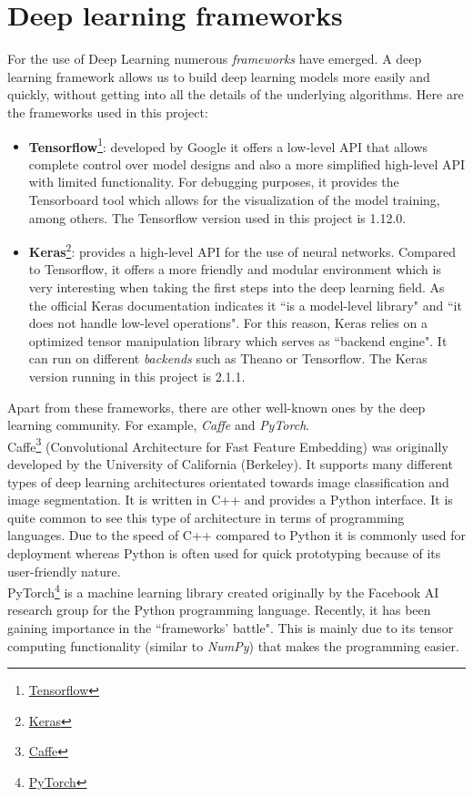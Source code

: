 \section{Deep learning frameworks}
For the use of Deep Learning numerous \textit{frameworks} have emerged. A deep learning framework allows us to build deep learning models more easily and quickly, without getting into all the details of the underlying algorithms. Here are the frameworks used in this project:
\begin{itemize}
\item \textbf{Tensorflow}\footnote {\href{https://www.tensorflow.org/}{Tensorflow}}: developed by Google it offers a low-level API that allows complete control over model designs and also a more simplified high-level API with limited functionality. For debugging purposes, it provides the Tensorboard tool which allows for the visualization of the model training, among others. The Tensorflow version used in this project is 1.12.0.
\item \textbf{Keras}\footnote {\href{https://keras.io/}{Keras}}: provides a high-level API for the use of neural networks. Compared to Tensorflow, it offers a more friendly and modular environment which is very interesting when taking the first steps into the deep learning field. As the official Keras documentation indicates it ``is a model-level library" and ``it does not handle low-level operations". For this reason, Keras relies on a optimized tensor manipulation library which serves as ``backend engine". It can run on different \textit{backends} such as Theano or Tensorflow. The Keras version running in this project is 2.1.1.
\end{itemize}
Apart from these frameworks, there are other well-known ones by the deep learning community. For example, \textit{Caffe} and \textit{PyTorch}.\\
Caffe\footnote {\href{https://caffe.berkeleyvision.org/}{Caffe}} (Convolutional Architecture for Fast Feature Embedding) was originally developed by the University of California (Berkeley). It supports many different types of deep learning architectures orientated towards image classification and image segmentation. It is written in C++ and provides a Python interface. It is quite common to see this type of architecture in terms of programming languages. Due to the speed of C++ compared to Python it is commonly used for deployment whereas Python is often used for quick prototyping because of its user-friendly nature.\\
PyTorch\footnote {\href{https://pytorch.org/}{PyTorch}} is a machine learning library created originally by the Facebook AI research group for the Python programming language. Recently, it has been gaining importance in the ``frameworks' battle". This is mainly due to its tensor computing functionality (similar to \textit{NumPy}) that makes the programming easier.

